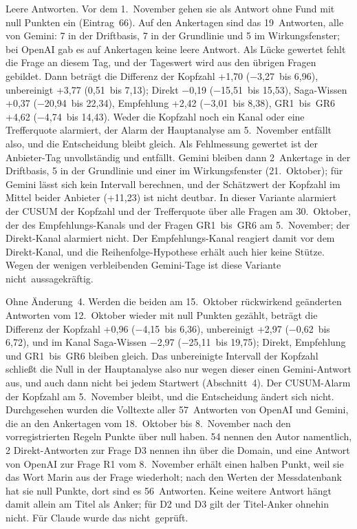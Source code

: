 \documentclass[11pt]{article}
\begin{document}
Leere Antworten. Vor dem 1.~November gehen sie als Antwort ohne Fund mit null Punkten ein (Eintrag~66). Auf den Ankertagen sind das 19~Antworten, alle von Gemini: 7 in der Driftbasis, 7 in der Grundlinie und 5 im Wirkungsfenster; bei OpenAI gab es auf Ankertagen keine leere Antwort. Als Lücke gewertet fehlt die Frage an diesem Tag, und der Tageswert wird aus den übrigen Fragen gebildet. Dann beträgt die Differenz der Kopfzahl +1,70 (−3,27~bis 6,96), unbereinigt +3,77 (0,51~bis 7,13); Direkt −0,19 (−15,51~bis 15,53), Saga-Wissen +0,37 (−20,94~bis 22,34), Empfehlung +2,42 (−3,01~bis 8,38), GR1~bis~GR6 +4,62 (−4,74~bis 14,43). Weder die Kopfzahl noch ein Kanal oder eine Trefferquote alarmiert, der Alarm der Hauptanalyse am 5.~November entfällt also, und die Entscheidung bleibt gleich. Als Fehlmessung gewertet ist der Anbieter-Tag unvollständig und entfällt. Gemini bleiben dann 2~Ankertage in der Driftbasis, 5 in der Grundlinie und einer im Wirkungsfenster (21.~Oktober); für Gemini lässt sich kein Intervall berechnen, und der Schätzwert der Kopfzahl im Mittel beider Anbieter (+11,23) ist nicht deutbar. In dieser Variante alarmiert der CUSUM der Kopfzahl und der Trefferquote über alle Fragen am 30.~Oktober, der des Empfehlungs-Kanals und der Fragen GR1~bis~GR6 am 5.~November; der Direkt-Kanal alarmiert nicht. Der Empfehlungs-Kanal reagiert damit vor dem Direkt-Kanal, und die Reihenfolge-Hypothese erhält auch hier keine Stütze. Wegen der wenigen verbleibenden Gemini-Tage ist diese Variante nicht~\mbox{aussagekräftig.}

Ohne Änderung~4. Werden die beiden am 15.~Oktober rückwirkend geänderten Antworten vom 12.~Oktober wieder mit null Punkten gezählt, beträgt die Differenz der Kopfzahl +0,96 (−4,15~bis 6,36), unbereinigt +2,97 (−0,62~bis 6,72), und im Kanal Saga-Wissen −2,97 (−25,11~bis 19,75); Direkt, Empfehlung und GR1~bis~GR6 bleiben gleich. Das unbereinigte Intervall der Kopfzahl schließt die Null in der Hauptanalyse also nur wegen dieser einen Gemini-Antwort aus, und auch dann nicht bei jedem Startwert (Abschnitt~4). Der CUSUM-Alarm der Kopfzahl am 5.~November bleibt, und die Entscheidung ändert sich nicht. Durchgesehen wurden die Volltexte aller 57~Antworten von OpenAI und Gemini, die an den Ankertagen vom 18.~Oktober bis 8.~November nach den vorregistrierten Regeln Punkte über null haben. 54 nennen den Autor namentlich, 2 Direkt-Antworten zur Frage D3 nennen ihn über die Domain, und eine Antwort von OpenAI zur Frage R1 vom 8.~November erhält einen halben Punkt, weil sie das Wort Marin aus der Frage wiederholt; nach den Werten der Messdatenbank hat sie null Punkte, dort sind es 56~Antworten. Keine weitere Antwort hängt damit allein am Titel als Anker; für D2 und D3 gilt der Titel-Anker ohnehin nicht. Für Claude wurde das nicht~\mbox{geprüft.}
\end{document}
